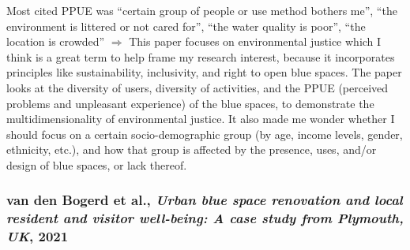 \documentclass{article}
\begin{document}
\begin{outline}
	\1 Most cited PPUE was ``certain group of people or use method bothers me'', ``the environment is littered or not cared for'', ``the water quality is poor'', ``the location is crowded''
	\1 $\Rightarrow$ This paper focuses on environmental justice which I think is a great term to help frame my research interest, because it incorporates principles like sustainability, inclusivity, and right to open blue spaces. The paper looks at the diversity of users, diversity of activities, and the PPUE (perceived problems and unpleasant experience) of the blue spaces, to demonstrate the multidimensionality of environmental justice. It also made me wonder whether I should focus on a certain socio-demographic group (by age, income levels, gender, ethnicity, etc.), and  how that group is affected by the presence, uses, and/or design of blue spaces, or lack thereof. 

\end{outline}

\subsubsection{van den Bogerd et al., \textit{Urban blue space renovation and local resident and visitor well-being: A case study from Plymouth, UK}, 2021}

\parencite{van2021urban}
\end{document}
